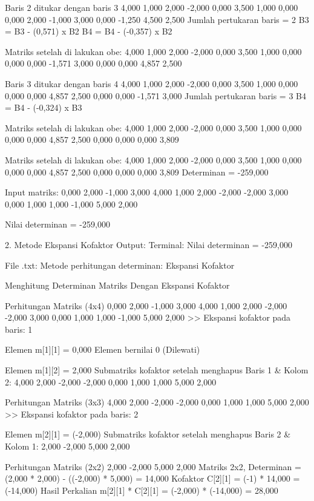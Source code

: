 \documentclass[12pt]{article}
\begin{document}
\begin{enumerate}
\begin{keluaran}
Baris 2 ditukar dengan baris 3
4,000 1,000 2,000 -2,000 
0,000 3,500 1,000 0,000 
0,000 2,000 -1,000 3,000 
0,000 -1,250 4,500 2,500 
Jumlah pertukaran baris = 2
B3 = B3 - (0,571) x B2
B4 = B4 - (-0,357) x B2

Matriks setelah di lakukan obe: 
4,000 1,000 2,000 -2,000 
0,000 3,500 1,000 0,000 
0,000 0,000 -1,571 3,000 
0,000 0,000 4,857 2,500 

Baris 3 ditukar dengan baris 4
4,000 1,000 2,000 -2,000 
0,000 3,500 1,000 0,000 
0,000 0,000 4,857 2,500 
0,000 0,000 -1,571 3,000 
Jumlah pertukaran baris = 3
B4 = B4 - (-0,324) x B3

Matriks setelah di lakukan obe: 
4,000 1,000 2,000 -2,000 
0,000 3,500 1,000 0,000 
0,000 0,000 4,857 2,500 
0,000 0,000 0,000 3,809 

Matriks setelah di lakukan obe: 
4,000 1,000 2,000 -2,000 
0,000 3,500 1,000 0,000 
0,000 0,000 4,857 2,500 
0,000 0,000 0,000 3,809 
Determinan = -259,000

Input matriks:
0,000	2,000	-1,000	3,000
4,000	1,000	2,000	-2,000
-2,000	3,000	0,000	1,000
1,000	-1,000	5,000	2,000

Nilai determinan = -259,000

2. Metode Ekspansi Kofaktor
Output:
Terminal:
Nilai determinan = -259,000

File .txt:
Metode perhitungan determinan: Ekspansi Kofaktor

Menghitung Determinan Matriks Dengan Ekspansi Kofaktor

Perhitungan Matriks (4x4)
0,000 2,000 -1,000 3,000 
4,000 1,000 2,000 -2,000 
-2,000 3,000 0,000 1,000 
1,000 -1,000 5,000 2,000 
>> Ekspansi kofaktor pada baris: 1

Elemen m[1][1] = 0,000
Elemen bernilai 0 (Dilewati)


Elemen m[1][2] = 2,000
Submatriks kofaktor setelah menghapus Baris 1 & Kolom 2:
4,000 2,000 -2,000 
-2,000 0,000 1,000 
1,000 5,000 2,000 

Perhitungan Matriks (3x3)
4,000 2,000 -2,000 
-2,000 0,000 1,000 
1,000 5,000 2,000 
>> Ekspansi kofaktor pada baris: 2

Elemen m[2][1] = (-2,000)
Submatriks kofaktor setelah menghapus Baris 2 & Kolom 1:
2,000 -2,000 
5,000 2,000 

Perhitungan Matriks (2x2)
2,000 -2,000 
5,000 2,000 
Matriks 2x2, Determinan = (2,000 * 2,000) - ((-2,000) * 5,000) = 14,000
Kofaktor C[2][1] = (-1) * 14,000 = (-14,000)
Hasil Perkalian m[2][1] * C[2][1] = (-2,000) * (-14,000) = 28,000


\end{keluaran}
\end{enumerate}
\end{document}
